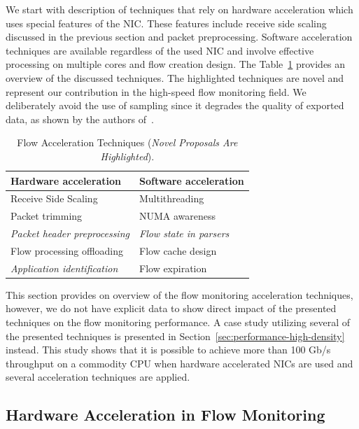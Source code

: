 We start with description of techniques that rely on hardware acceleration which uses special features of the NIC. These features include receive side scaling discussed in the previous section and packet preprocessing. Software acceleration techniques are available regardless of the used NIC and involve effective processing on multiple cores and flow creation design. The Table~\ref{tab:flow-acc-techniques} provides an overview of the discussed techniques. The highlighted techniques are novel and represent our contribution in the high-speed flow monitoring field. We deliberately avoid the use of sampling since it degrades the quality of exported data, as shown by the authors of~\cite{Brauckhoff-2006-Impact}.

\begin{table}[ht!]
    \centering
    \begin{tabular}{l|l}
    \toprule
    \textbf{Hardware acceleration} & \textbf{Software acceleration} \\ \hline
    Receive Side Scaling & Multithreading \\
    Packet trimming & NUMA awareness \\
    \emph{Packet header preprocessing} & \emph{Flow state in parsers} \\
    Flow processing offloading & Flow cache design \\
    \emph{Application identification} & Flow expiration \\ \bottomrule
    \end{tabular}
    \caption{Flow Acceleration Techniques (\emph{Novel Proposals Are Highlighted}).}
    \label{tab:flow-acc-techniques}
\end{table}

This section provides on overview of the flow monitoring acceleration techniques, however, we do not have explicit data to show direct impact of the presented techniques on the flow monitoring performance. A case study utilizing several of the presented techniques is presented in Section~\ref{sec:performance-high-density} instead. This study shows that it is possible to achieve more than 100 Gb/s throughput on a commodity CPU when hardware accelerated NICs are used and several acceleration techniques are applied.


\subsection{Hardware Acceleration in Flow Monitoring}\label{sec:performance-hw-acceleration}

